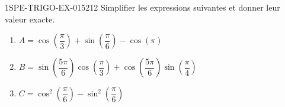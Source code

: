 \begin{exercice}{1SPE-TRIGO-EX-015}{2}{12}
Simplifier les expressions suivantes et donner leur valeur exacte.
\begin{enumerate}
  \item $A = \cos\!\left(\dfrac{\pi}{3}\right) + \sin\!\left(\dfrac{\pi}{6}\right) - \cos(\pi)$
  \item $B = \sin\!\left(\dfrac{5\pi}{6}\right)\cos\!\left(\dfrac{\pi}{3}\right) + \cos\!\left(\dfrac{5\pi}{6}\right)\sin\!\left(\dfrac{\pi}{4}\right)$
  \item $C = \cos^2\!\left(\dfrac{\pi}{6}\right) - \sin^2\!\left(\dfrac{\pi}{6}\right)$
\end{enumerate}
\end{exercice}

